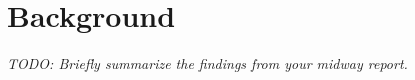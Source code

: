 \documentclass{article}
\begin{document}
\section{Background}

\textit{TODO: Briefly summarize the findings from your midway report.}







\end{document}
